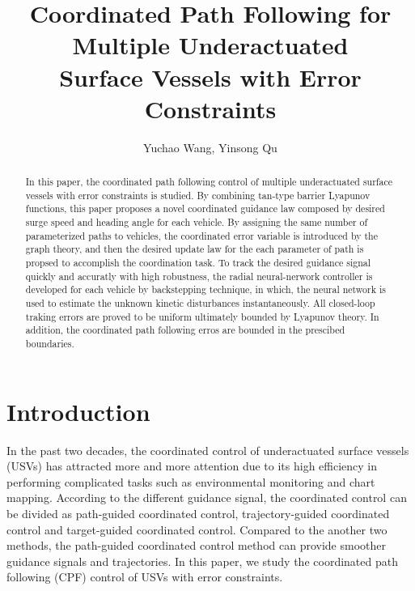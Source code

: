 \documentclass[english]{cccconf}
\begin{document}
\title{Coordinated Path Following for Multiple Underactuated \\Surface Vessels with Error Constraints}

\author{Yuchao Wang, Yinsong Qu}


\maketitle

\begin{abstract}
In this paper, the coordinated path following control of multiple underactuated surface vessels with error constraints is studied. By combining tan-type barrier Lyapunov functions, this paper proposes a novel coordinated guidance law composed by desired surge speed and heading angle for each vehicle. By assigning the same number of parameterized paths to vehicles, the coordinated error variable is introduced by the graph theory, and then the desired update law for the each parameter of path is propsed to accomplish the coordination task. To track the desired guidance signal quickly and accuratly with high robustness, the radial neural-nerwork controller is developed for each vehicle by backstepping technique, in which, the neural network is used to estimate the unknown kinetic disturbances instantaneously. All closed-loop traking errors are proved to be uniform ultimately bounded by Lyapunov theory. In addition, the coordinated path following erros are bounded in the prescibed boundaries.
\end{abstract}



\section{Introduction}

In the past two decades, the coordinated control of underactuated surface vessels (USVs) has attracted more and more attention due to its high efficiency in performing complicated tasks such as environmental monitoring and chart mapping. According to the different guidance signal, the coordinated control can be divided as path-guided coordinated control, trajectory-guided coordinated control and target-guided coordinated control. Compared to the another two methods, the path-guided coordinated control method can provide smoother guidance signals and trajectories. In this paper, we study the coordinated path following (CPF) control of USVs with error constraints.
\end{document}
